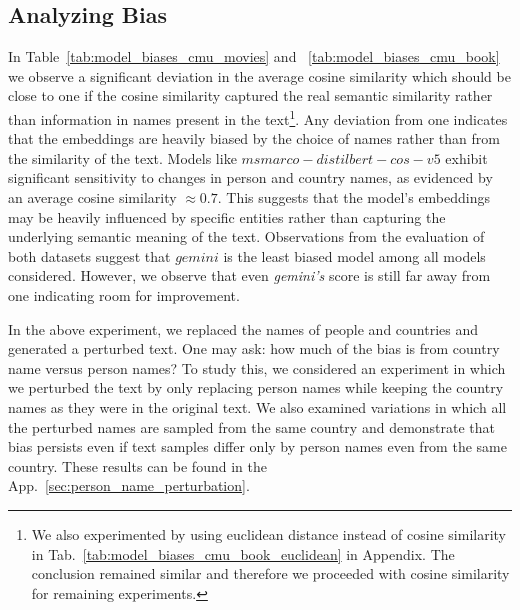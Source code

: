\subsection{Analyzing Bias}
In Table~\ref{tab:model_biases_cmu_movies} and ~\ref{tab:model_biases_cmu_book} we observe a significant deviation in the average cosine similarity which should be close to one if the cosine similarity captured the real semantic similarity rather than information in names present in the text\footnote{We also experimented by using euclidean distance instead of cosine similarity in Tab.~\ref{tab:model_biases_cmu_book_euclidean} in Appendix. The conclusion remained similar and therefore we proceeded with cosine similarity for remaining experiments.}. Any deviation from one indicates that the embeddings are heavily biased by the choice of names rather than from the similarity of the text. Models like $msmarco{-}distilbert{-}cos{-}v5$ exhibit significant sensitivity to changes in person and country names, as evidenced by an average cosine similarity $\approx0.7$. This suggests that the model's embeddings may be heavily influenced by specific entities rather than capturing the underlying semantic meaning of the text. Observations from the evaluation of both datasets suggest that $gemini$ is the least biased model among all models considered. However, we observe that even \textit{gemini's} score is still far away from one indicating room for improvement.

In the above experiment, we replaced the names of people and countries and generated a perturbed text. One may ask: how much of the bias is from country name versus person names? To study this, we considered an experiment in which we perturbed the text by only replacing person names while keeping the country names as they were in the original text. We also examined variations in which all the perturbed names are sampled from the same country and demonstrate that bias persists even if text samples differ only by person names even from the same country. These results can be found in the App.~\ref{sec:person_name_perturbation}.

